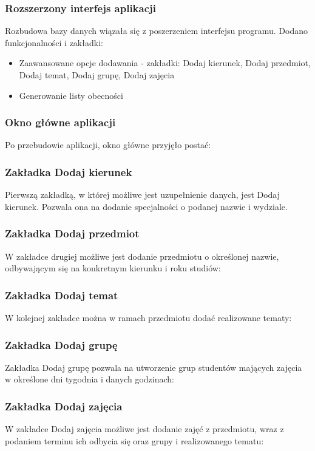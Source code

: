 \documentclass{beamer}
\begin{document}
\begin{frame}
\frametitle{Rozszerzony interfejs aplikacji}
Rozbudowa bazy danych wiązała się z poszerzeniem interfejsu programu. Dodano funkcjonalności i zakładki:


\begin{itemize}
\item Zaawansowane opcje dodawania - zakładki: Dodaj kierunek, Dodaj przedmiot, Dodaj temat, Dodaj grupę, Dodaj zajęcia
\item Generowanie listy obecności
\end{itemize}
\end{frame}

\begin{frame}
\frametitle{Okno główne aplikacji}
Po przebudowie aplikacji, okno główne przyjęło postać:

\end{frame}

\begin{frame}
\frametitle{Zakładka Dodaj kierunek}
Pierwszą zakładką, w której możliwe jest uzupełnienie danych, jest Dodaj kierunek. Pozwala ona na dodanie specjalności o podanej nazwie i wydziale.

\end{frame}

\begin{frame}
\frametitle{Zakładka Dodaj przedmiot}
W zakładce drugiej możliwe jest dodanie przedmiotu o określonej nazwie, odbywającym się na konkretnym kierunku i roku studiów:

\end{frame}

\begin{frame}
\frametitle{Zakładka Dodaj temat}
W kolejnej zakładce można w ramach przedmiotu dodać realizowane tematy:

\end{frame}

\begin{frame}
\frametitle{Zakładka Dodaj grupę}
Zakładka Dodaj grupę pozwala na utworzenie grup studentów mających zajęcia w określone dni tygodnia i danych godzinach:

\end{frame}

\begin{frame}
\frametitle{Zakładka Dodaj zajęcia}
W zakładce Dodaj zajęcia możliwe jest dodanie zajęć z przedmiotu, wraz z podaniem terminu ich odbycia się oraz grupy i realizowanego tematu:

\end{frame}
\end{document}
